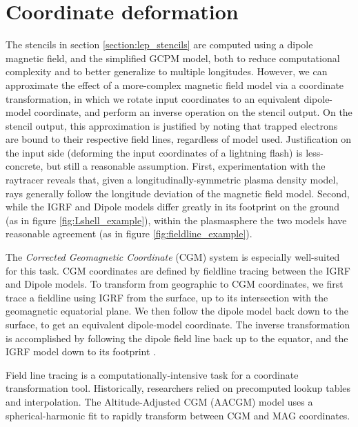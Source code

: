 \section{Coordinate deformation}
The stencils in section \ref{section:lep_stencils} are computed using a dipole magnetic field, and the simplified GCPM model, both to reduce computational complexity and to better generalize to multiple longitudes. However, we can approximate the effect of a more-complex magnetic field model via a coordinate transformation, in which we rotate input coordinates to an equivalent dipole-model coordinate, and perform an inverse operation on the stencil output. On the stencil output, this approximation is justified by noting that trapped electrons are bound to their respective field lines, regardless of model used. Justification on the input side (deforming the input coordinates of a lightning flash) is less-concrete, but still a reasonable assumption. First, experimentation with the raytracer reveals that, given a longitudinally-symmetric plasma density model, rays generally follow the longitude deviation of the magnetic field model. Second, while the IGRF and Dipole models differ greatly in its footprint on the ground (as in figure \ref{fig:Lshell_example}), within the plasmasphere the two models have reasonable agreement (as in figure \ref{fig:fieldline_example}).

The \emph{Corrected Geomagnetic Coordinate} (CGM) \citep{Hakura1965} system is especially well-suited for this task. CGM coordinates are defined by fieldline tracing between the IGRF and Dipole models. To transform from geographic to CGM coordinates, we first trace a fieldline using IGRF from the surface, up to its intersection with the geomagnetic equatorial plane. We then follow the dipole model back down to the surface, to get an equivalent dipole-model coordinate. The inverse transformation is accomplished by following the dipole field line back up to the equator, and the IGRF model down to its footprint \citep{Laundal2016}.

Field line tracing is a computationally-intensive task for a coordinate transformation tool. Historically, researchers relied on precomputed lookup tables and interpolation. The Altitude-Adjusted CGM (AACGM) model \citep{Baker1989, Shepherd2014} uses a spherical-harmonic fit to rapidly transform between CGM and MAG coordinates.

